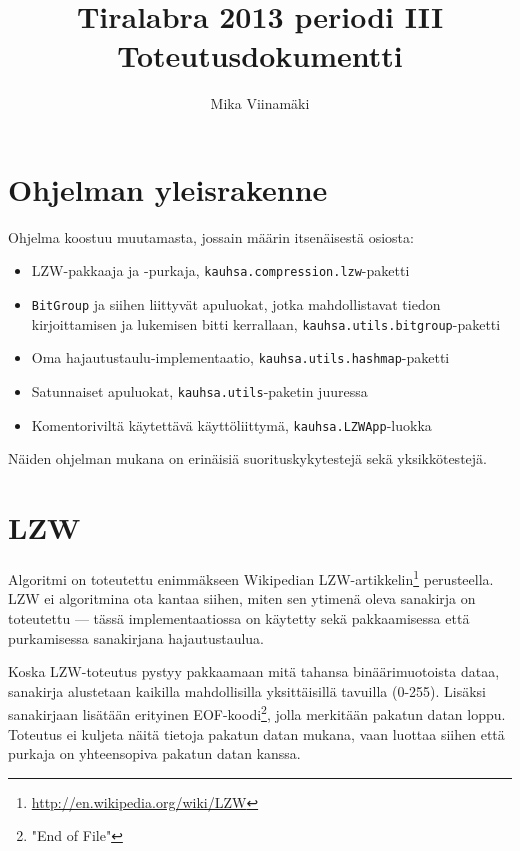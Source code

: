 \documentclass{article}
\begin{document}
\title{Tiralabra 2013 periodi III \\ Toteutusdokumentti}
\author{Mika Viinamäki}
\maketitle

\section{Ohjelman yleisrakenne}

Ohjelma koostuu muutamasta, jossain määrin itsenäisestä osiosta:
\begin{itemize}
	\item LZW-pakkaaja ja -purkaja, \texttt{kauhsa.compression.lzw}-paketti
	\item \texttt{BitGroup} ja siihen liittyvät apuluokat, jotka mahdollistavat tiedon kirjoittamisen ja lukemisen bitti kerrallaan, \texttt{kauhsa.utils.bitgroup}-paketti
	\item Oma hajautustaulu-implementaatio, \texttt{kauhsa.utils.hashmap}-paketti
	\item Satunnaiset apuluokat, \texttt{kauhsa.utils}-paketin juuressa
	\item Komentoriviltä käytettävä käyttöliittymä, \texttt{kauhsa.LZWApp}-luokka
\end{itemize}

Näiden ohjelman mukana on erinäisiä suorituskykytestejä sekä yksikkötestejä.

\section {LZW}

Algoritmi on toteutettu enimmäkseen Wikipedian LZW-artikkelin\footnote{\url{http://en.wikipedia.org/wiki/LZW}} perusteella. LZW ei algoritmina ota kantaa siihen, miten sen ytimenä oleva sanakirja on toteutettu --- tässä implementaatiossa on käytetty sekä pakkaamisessa että purkamisessa sanakirjana hajautustaulua.

Koska LZW-toteutus pystyy pakkaamaan mitä tahansa binäärimuotoista dataa, sanakirja alustetaan kaikilla mahdollisilla yksittäisillä tavuilla (0-255). Lisäksi sanakirjaan lisätään erityinen EOF-koodi\footnote{"End of File"}, jolla merkitään pakatun datan loppu. Toteutus ei kuljeta näitä tietoja pakatun datan mukana, vaan luottaa siihen että purkaja on yhteensopiva pakatun datan kanssa.
\end{document}
